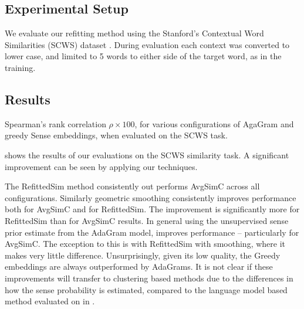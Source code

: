\documentclass{sig-alternate}
\begin{document}
\subsection{Experimental Setup}
We evaluate our refitting method using the Stanford's Contextual Word Similarities (SCWS) dataset \parencite{Huang2012}.
During evaluation each context was converted to lower case, and limited to 5 words to either side of the target word, as in the training.


\subsection{Results}

\begin{table}
	\begin{adjustbox}{max width=\columnwidth}
	\end{adjustbox}

\caption{Spearman's rank correlation $\rho \times 100$, for various configurations of AgaGram and greedy Sense embeddings, when evaluated on the SCWS task.} \label{swscres}
\end{table}

 shows the results of our evaluations on the SCWS similarity task. A significant improvement can be seen by applying our techniques.

The RefittedSim method consistently out performs AvgSimC across all configurations.
Similarly geometric smoothing consistently improves performance both for AvgSimC and for RefittedSim. The improvement is significantly more for RefittedSim than for AvgSimC results.
In general using the unsupervised sense prior estimate from the AdaGram model, improves performance -- particularly for AvgSimC. The exception to this is with RefittedSim with smoothing, where it makes very little difference. 
Unsurprisingly, given its low quality, the Greedy embeddings are always outperformed by AdaGrams.
It is not clear if these improvements will transfer to clustering based methods due to the differences in how the sense probability is estimated, compared to the language model based method evaluated on in .
\end{document}
